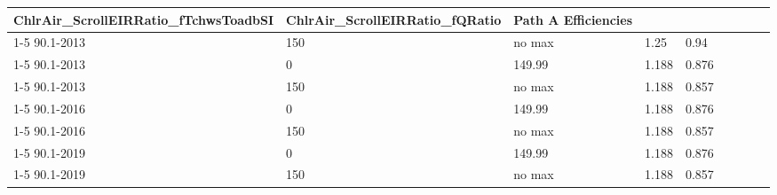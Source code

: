 \begin{table}
\begin{tabular}{|p{0.6in}|p{0.4in}|p{0.4in}|p{0.4in}|p{0.4in}|p{0.6in}|p{0.6in}|p{0.6in}|p{0.6in}|}
  \multirow{8}{*}{\parbox{0.6in}{ChlrAir\_ScrollEIRRatio\_fTchwsToadbSI}} &
  \multirow{8}{*}{\parbox{0.6in}{ChlrAir\_ScrollEIRRatio\_fQRatio}} &
  \multirow{8}{*}{\parbox{0.6in}{Path A Efficiencies}} \\ \cline{1-5}
90.1-2013         & 150 & no max   & 1.25  & 0.94  &  &  &  &                                               \\ \cline{1-5}
90.1-2013         & 0   & 149.99 & 1.188 & 0.876 &  &  &  &                                               \\ \cline{1-5}
90.1-2013         & 150 & no max   & 1.188 & 0.857 &  &  &  &                                               \\ \cline{1-5}
90.1-2016         & 0   & 149.99 & 1.188 & 0.876 &  &  &  &                                               \\ \cline{1-5}
90.1-2016         & 150 & no max   & 1.188 & 0.857 &  &  &  &                                               \\ \cline{1-5}
90.1-2019         & 0   & 149.99 & 1.188 & 0.876 &  &  &  &                                               \\ \cline{1-5}
90.1-2019         & 150 & no max   & 1.188 & 0.857 &  &  &  &                                               \\ \hline
\end{tabular}
\end{table}
